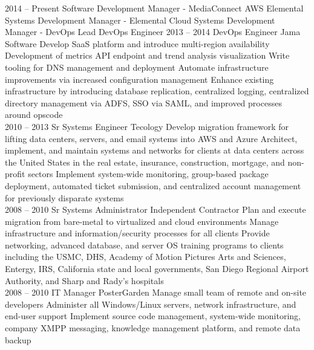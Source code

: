 \documentclass[10pt]{jvresume2020} %
\begin{document}
\begin{entrylist}
	\entry
		{2014 -- Present}
		{Software Development Manager - MediaConnect}
		{AWS Elemental}
		{\lorem \lorem \lorem}
	\entry
	  {}
		{Systems Development Manager - Elemental Cloud}
		{}
		{\lorem \lorem \lorem}
	\entry
	  {}
		{Systems Development Manager - DevOps}
		{}
		{\lorem \lorem \lorem}
	\entry
	  {}
		{Lead DevOps Engineer}
			{}
			{\lorem \lorem \lorem}
	\entry
		{2013 -- 2014}
		{DevOps Engineer}
		{Jama Software}
		{{Develop SaaS platform and introduce multi-region availability\linebreak
		Development of metrics API endpoint and trend analysis visualization\linebreak
		Write tooling for DNS management and deployment\linebreak
		Automate infrastructure improvements via increased configuration management\linebreak
		Enhance existing infrastructure by introducing database replication, centralized logging, centralized directory management via ADFS, SSO via SAML, and improved processes around opscode\\
		}}
	\entry
		{2010 -- 2013}
		{Sr Systems Engineer}
		{Tecology}
		{{Develop migration framework for lifting data centers, servers, and email systems into AWS and Azure\linebreak
		Architect, implement, and maintain systems and networks for clients at data centers across the United States in the real estate, insurance, construction, mortgage, and non-profit sectors\linebreak
		Implement system-wide monitoring, group-based package deployment, automated ticket submission, and centralized account management for previously disparate systems\\
		}}
	\entry
		{2008 -- 2010}
		{Sr Systems Administrator}
		{Independent Contractor}
		{{Plan and execute migration from bare-metal to virtualized and cloud environments\linebreak
		Manage infrastructure and information/security processes for all clients\linebreak
		Provide networking, advanced database, and server OS training programs to clients including the USMC, DHS, Academy of Motion Pictures Arts and Sciences, Entergy, IRS, California state and local governments, San Diego Regional Airport Authority, and Sharp and Rady’s hospitals\\
		}}
	\entry
		{2008 -- 2010}
		{IT Manager}
		{PosterGarden}
		{{Manage small team of remote and on-site developers\linebreak
		Administer all Windows/Linux servers, network infrastructure, and end-user support\linebreak
		Implement source code management, system-wide monitoring, company XMPP messaging, knowledge management platform, and remote data backup\\
		}}
\end{entrylist}
\end{document}

